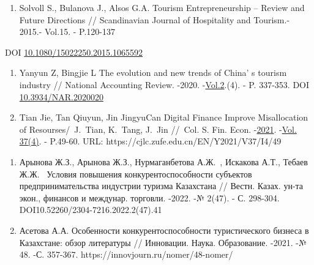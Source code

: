 \begin{references}

\begin{enumerate}
\def\labelenumi{\arabic{enumi}.}
\item
  Solvoll S., Bulanova J., Alsos G.A. Tourism Entrepreneurship -- Review
  and Future Directions // Scandinavian Journal of Hospitality and
  Tourism.- 2015.- Vol.15. - P.120-137
\end{enumerate}

DOI
\href{http://dx.doi.org/10.1080/15022250.2015.1065592}{10.1080/15022250.2015.1065592}

\begin{enumerate}
\def\labelenumi{\arabic{enumi}.}
\setcounter{enumi}{1}
\item
  Yanyun Z, Bingjie L The evolution and new trends of
  China' s tourism industry // National Accounting
  Review. -2020.
  -\href{https://www.aimspress.com/nar/article/archives}{Vol.2}.(4). -
  P. 337-353. DOI
  \href{https://doi.org/10.3934/NAR.2020020}{10.3934/NAR.2020020}
\item
  Tian Jie, Tan Qiuyun, Jin JingyuCan Digital Finance Improve
  Misallocation of Resourses/~J.~Tian, K.~Tang, J.~Jin //~Col. S. Fin.
  Econ.
  -\href{https://cjlc.zufe.edu.cn/EN/article/showTenYearVolumnDetail.do?nian=2021}{2021}.
  -\href{https://cjlc.zufe.edu.cn/EN/article/showTenYearVolumnDetail.do?nian=2021}{Vol.
  37}\href{file:///C:/Users/admin/Desktop/Вестник\%20КазУТБ/4\%202024/(4)}{(4)}.
  - P.49-60. URL: {https://cjlc.zufe.edu.cn/EN/Y2021/V37/I4/49}
\end{enumerate}


\begin{enumerate}
\def\labelenumi{\arabic{enumi}.}
\setcounter{enumi}{3}
\item
  Арынова Ж.З., Арынова Ж.З., Нурмаганбетова А.Ж.~, Искакова А.Т.,
  Тебаев Ж.Ж.~ Условия повышения конкурентоспособности субъектов
  предпринимательства индустрии туризма Казахстана // Вестн. Казах.
  ун-та экон., финансов и междунар. торговли. -2022. -№ 2(47). - С.
  298-304.\\ DOI10.52260/2304-7216.2022.2(47).41
\item
  Асетова А.А. Особенности конкурентоспособности туристического бизнеса
  в Казахстане: обзор литературы // Инновации. Наука. Образование.
  -2021. -№ 48. -С. 357-367.   https://innovjourn.ru/nomer/48-nomer/
\end{enumerate}


\end{references}
